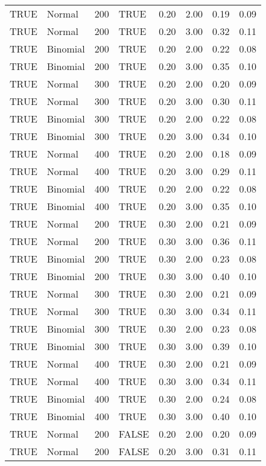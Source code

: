 \begin{longtable}{llrlrrrr}
  TRUE & Normal & 200 & TRUE & 0.20 & 2.00 & 0.19 & 0.09 \\ 
  TRUE & Normal & 200 & TRUE & 0.20 & 3.00 & 0.32 & 0.11 \\ 
  TRUE & Binomial & 200 & TRUE & 0.20 & 2.00 & 0.22 & 0.08 \\ 
  TRUE & Binomial & 200 & TRUE & 0.20 & 3.00 & 0.35 & 0.10 \\ 
  TRUE & Normal & 300 & TRUE & 0.20 & 2.00 & 0.20 & 0.09 \\ 
  TRUE & Normal & 300 & TRUE & 0.20 & 3.00 & 0.30 & 0.11 \\ 
  TRUE & Binomial & 300 & TRUE & 0.20 & 2.00 & 0.22 & 0.08 \\ 
  TRUE & Binomial & 300 & TRUE & 0.20 & 3.00 & 0.34 & 0.10 \\ 
  TRUE & Normal & 400 & TRUE & 0.20 & 2.00 & 0.18 & 0.09 \\ 
  TRUE & Normal & 400 & TRUE & 0.20 & 3.00 & 0.29 & 0.11 \\ 
  TRUE & Binomial & 400 & TRUE & 0.20 & 2.00 & 0.22 & 0.08 \\ 
  TRUE & Binomial & 400 & TRUE & 0.20 & 3.00 & 0.35 & 0.10 \\ 
  TRUE & Normal & 200 & TRUE & 0.30 & 2.00 & 0.21 & 0.09 \\ 
  TRUE & Normal & 200 & TRUE & 0.30 & 3.00 & 0.36 & 0.11 \\ 
  TRUE & Binomial & 200 & TRUE & 0.30 & 2.00 & 0.23 & 0.08 \\ 
  TRUE & Binomial & 200 & TRUE & 0.30 & 3.00 & 0.40 & 0.10 \\ 
  TRUE & Normal & 300 & TRUE & 0.30 & 2.00 & 0.21 & 0.09 \\ 
  TRUE & Normal & 300 & TRUE & 0.30 & 3.00 & 0.34 & 0.11 \\ 
  TRUE & Binomial & 300 & TRUE & 0.30 & 2.00 & 0.23 & 0.08 \\ 
  TRUE & Binomial & 300 & TRUE & 0.30 & 3.00 & 0.39 & 0.10 \\ 
  TRUE & Normal & 400 & TRUE & 0.30 & 2.00 & 0.21 & 0.09 \\ 
  TRUE & Normal & 400 & TRUE & 0.30 & 3.00 & 0.34 & 0.11 \\ 
  TRUE & Binomial & 400 & TRUE & 0.30 & 2.00 & 0.24 & 0.08 \\ 
  TRUE & Binomial & 400 & TRUE & 0.30 & 3.00 & 0.40 & 0.10 \\ 
  TRUE & Normal & 200 & FALSE & 0.20 & 2.00 & 0.20 & 0.09 \\ 
  TRUE & Normal & 200 & FALSE & 0.20 & 3.00 & 0.31 & 0.11 \\ 

\end{longtable}
